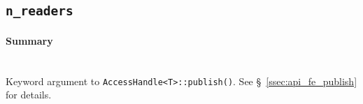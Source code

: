 \subsection{\texttt{n\_readers}}

\paragraph{Summary}\mbox{}\\ 

Keyword argument to \texttt{AccessHandle<T>::publish()}.  See
\S~\ref{ssec:api_fe_publish} for details.


%
%
%
%
%
%




